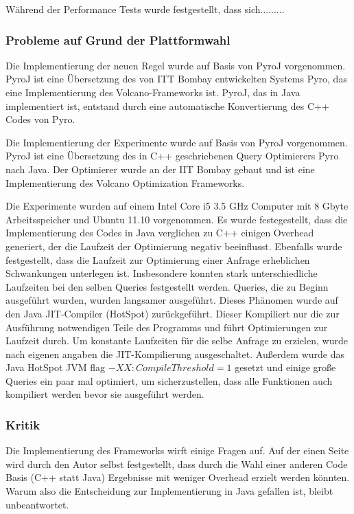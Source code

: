 Während der Performance Tests wurde festgestellt, dass sich.........


\subsubsection{Probleme auf Grund der Plattformwahl}
Die Implementierung der neuen Regel wurde auf Basis von PyroJ vorgenommen. PyroJ ist eine Übersetzung des von ITT Bombay entwickelten Systems Pyro, das eine Implementierung des Volcano-Frameworks ist. PyroJ, das in Java implementiert ist, entstand durch eine automatische Konvertierung des C++ Codes von Pyro. 

Die Implementierung der Experimente wurde auf Basis von PyroJ vorgenommen. PyroJ ist eine Übersetzung des in C++ geschriebenen Query Optimierers Pyro nach Java. Der Optimierer wurde an der IIT Bombay gebaut und ist eine Implementierung des Volcano Optimization Frameworks.

Die Experimente wurden auf einem Intel Core i5 3.5 GHz Computer mit 8 Gbyte Arbeitsspeicher und Ubuntu 11.10 vorgenommen. Es wurde festegestellt, dass die Implementierung des Codes in Java verglichen zu C++ einigen Overhead generiert, der die Laufzeit der Optimierung negativ beeinflusst. Ebenfalls wurde festgestellt, dass die Laufzeit zur Optimierung einer Anfrage erheblichen Schwankungen unterlegen ist. Insbesondere konnten stark unterschiedliche Laufzeiten bei den selben Queries festgestellt werden. Queries, die zu Beginn ausgeführt wurden, wurden langsamer ausgeführt. Dieses Phänomen wurde auf den Java JIT-Compiler (HotSpot) zurückgeführt. Dieser Kompiliert nur die zur Ausführung notwendigen Teile des Programms und führt Optimierungen zur Laufzeit durch. Um konstante Laufzeiten für die selbe Anfrage zu erzielen, wurde nach eigenen angaben die JIT-Kompilierung ausgeschaltet. Außerdem wurde das Java HotSpot JVM flag $-XX:CompileThreshold=1$ gesetzt und einige große Queries ein paar mal optimiert, um sicherzustellen, dass alle Funktionen auch kompiliert werden bevor sie ausgeführt werden.
 

\subsubsection{Kritik} 


Die Implementierung des Frameworks wirft einige Fragen auf. Auf der einen Seite wird durch den Autor selbst festgestellt, dass durch die Wahl einer anderen Code Basis (C++ statt Java) Ergebnisse mit weniger Overhead erzielt werden könnten. Warum also die Entscheidung zur Implementierung in Java gefallen ist, bleibt unbeantwortet.

